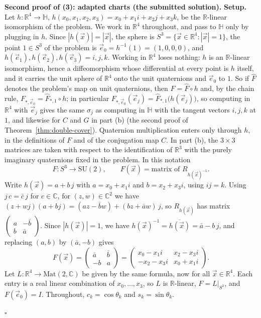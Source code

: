 \documentclass[11pt]{report}
\renewenvironment{proof}[1][Proof]{\noindent\textbf{#1.} }{\hfill$\square$\par\vspace{5pt}}
\begin{document}
\begin{proof}[Second proof of (3): adapted charts (the submitted solution)]
\textbf{Setup.} Let $h : \mathbb{R}^4 \to \mathbb{H}$, $h(x_0, x_1, x_2, x_3) = x_0 + x_1 i + x_2 j + x_3 k$, be the $\mathbb{R}$-linear isomorphism of the problem. We work in $\mathbb{R}^4$ throughout, and pass to $\mathbb{H}$ only by plugging in $h$. Since $|h(\vec x)| = |\vec x|$, the sphere is $S^3 = \{ \vec x \in \mathbb{R}^4 : |\vec x| = 1 \}$, the point $1 \in S^3$ of the problem is $\vec e_0 = h^{-1}(1) = (1, 0, 0, 0)$, and $h(\vec e_1), h(\vec e_2), h(\vec e_3) = i, j, k$. Working in $\mathbb{R}^4$ loses nothing: $h$ is an $\mathbb{R}$-linear isomorphism, hence a diffeomorphism whose differential at every point is $h$ itself, and it carries the unit sphere of $\mathbb{R}^4$ onto the unit quaternions and $\vec e_0$ to $1$. So if $\hat F$ denotes the problem's map on unit quaternions, then $F = \hat F \circ h$ and, by the chain rule, $F_{*,\vec e_0} = \hat F_{*,1} \circ h$; in particular $F_{*,\vec e_0}(\vec e_j) = \hat F_{*,1}\bigl(h(\vec e_j)\bigr)$, so computing in $\mathbb{R}^4$ with $\vec e_j$ gives the same $\sigma_j$ as computing in $\mathbb{H}$ with the tangent vectors $i, j, k$ at $1$, and likewise for $C$ and $G$ in part (b) (the second proof of Theorem~\ref{thm:double-cover}). Quaternion multiplication enters only through $h$, in the definitions of $F$ and of the conjugation map $C$. In part (b), the $3 \times 3$ matrices are taken with respect to the identification of $\mathbb{R}^3$ with the purely imaginary quaternions fixed in the problem. In this notation
\[
F : S^3 \to \mathrm{SU}(2), \qquad F(\vec x) = \text{matrix of } R_{h(\vec x)^{-1}} .
\]
Write $h(\vec x) = a + b\,j$ with $a = x_0 + x_1 i$ and $b = x_2 + x_3 i$, using $ij = k$. Using $j\,c = \bar c\,j$ for $c \in \mathbb{C}$, for $(z, w) \in \mathbb{C}^2$ we have $(z + wj)(a + bj) = (az - \bar b w) + (bz + \bar a w)\,j$, so $R_{h(\vec x)}$ has matrix $\begin{pmatrix} a & -\bar b \\ b & \bar a \end{pmatrix}$. Since $|h(\vec x)| = 1$, we have $h(\vec x)^{-1} = \overline{h(\vec x)} = \bar a - b\,j$, and replacing $(a, b)$ by $(\bar a, -b)$ gives
\[
F(\vec x) = \begin{pmatrix} \bar a & \bar b \\ -b & a \end{pmatrix} = \begin{pmatrix} x_0 - x_1 i & x_2 - x_3 i \\ -x_2 - x_3 i & x_0 + x_1 i \end{pmatrix}.
\]
Let $L : \mathbb{R}^4 \to \mathrm{Mat}(2, \mathbb{C})$ be given by the same formula, now for all $\vec x \in \mathbb{R}^4$. Each entry is a real linear combination of $x_0, \ldots, x_3$, so $L$ is $\mathbb{R}$-linear, $F = L|_{S^3}$, and $F(\vec e_0) = I$. Throughout, $c_k = \cos\theta_k$ and $s_k = \sin\theta_k$.


\end{proof}
\end{document}
